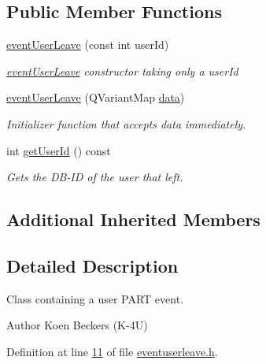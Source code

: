 \subsection*{Public Member Functions}
\begin{DoxyCompactItemize}
\item 
\hyperlink{classshared_1_1events_1_1event_user_leave_a76851237caa9a3624141051a812eece6}{event\-User\-Leave} (const int user\-Id)
\begin{DoxyCompactList}\small\item\em \hyperlink{classshared_1_1events_1_1event_user_leave}{event\-User\-Leave} constructor taking only a user\-Id \end{DoxyCompactList}\item 
\hyperlink{classshared_1_1events_1_1event_user_leave_a0e21c3c648f12950c674897b96e321c4}{event\-User\-Leave} (Q\-Variant\-Map \hyperlink{classshared_1_1events_1_1cls_event_a6cfb6b96d72fc1e7a101e61061ec2755}{data})
\begin{DoxyCompactList}\small\item\em Initializer function that accepts data immediately. \end{DoxyCompactList}\item 
int \hyperlink{classshared_1_1events_1_1event_user_leave_afb9cb12d52415109349d1469f1577353}{get\-User\-Id} () const 
\begin{DoxyCompactList}\small\item\em Gets the D\-B-\/\-I\-D of the user that left. \end{DoxyCompactList}\end{DoxyCompactItemize}
\subsection*{Additional Inherited Members}


\subsection{Detailed Description}
Class containing a user P\-A\-R\-T event. 

\begin{DoxyAuthor}{Author}
Koen Beckers (K-\/4\-U) 
\end{DoxyAuthor}


Definition at line \hyperlink{eventuserleave_8h_source_l00011}{11} of file \hyperlink{eventuserleave_8h_source}{eventuserleave.\-h}.



